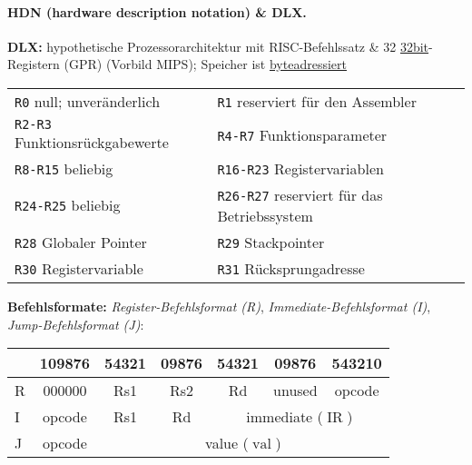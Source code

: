 \documentclass[8pt,a4paper]{article}
\newcommand{\imm}{\operatorname{IR}}
\newcommand{\val}{\operatorname{val}}
\begin{document}
\begin{multicols}{2}
\paragraph{HDN (hardware description notation) \& DLX.} \textbf{DLX:}
hypothetische Prozessorarchitektur mit RISC-Befehlssatz \& 32 \underline{32bit}-Registern (GPR) (Vorbild MIPS); Speicher ist \underline{byteadressiert} \\
\begin{tabular}{ll}
\texttt{R0} null; unveränderlich & \texttt{R1} reserviert für den Assembler                \\
\texttt{R2-R3} Funktionsrückgabewerte & \texttt{R4-R7} Funktionsparameter                  \\ 
\texttt{R8-R15} beliebig              & \texttt{R16-R23} Registervariablen                 \\ 
\texttt{R24-R25} beliebig             & \texttt{R26-R27} reserviert für das Betriebssystem \\ 
\texttt{R28} Globaler Pointer         & \texttt{R29} Stackpointer                          \\ 
\texttt{R30} Registervariable         & \texttt{R31} Rücksprungadresse                     \\
\end{tabular}
\textbf{Befehlsformate:} \emph{Register-Befehlsformat (R)}, \emph{Immediate-Befehlsformat (I)}, \emph{Jump-Befehlsformat (J)}:\\
\begin{tabular}{| l | c | c | c | c | c | c |}
\hline
  & 109876 & 54321 & 09876 & 54321 & 09876  & 543210                  \\\hline
R & 000000 & Rs1   & Rs2   & Rd    & unused & opcode                  \\\hline
I & opcode & Rs1   & Rd    & \multicolumn{3}{|c|}{immediate ($\imm$)} \\\hline
J & opcode & \multicolumn{5}{|c|}{value ($\val$)}                     \\\hline
\end{tabular}


\end{multicols}
\end{document}
